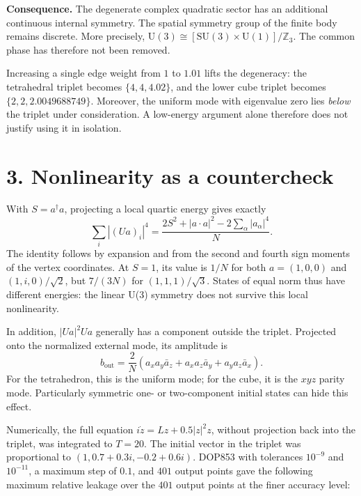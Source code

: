 \documentclass[a4paper,11pt]{article}
\begin{document}
\textbf{Consequence.} The degenerate complex quadratic sector has an additional continuous internal symmetry. The spatial symmetry group of the finite body remains discrete. More precisely, $\mathrm{U}(3)\cong[\mathrm{SU}(3)\times\mathrm{U}(1)]/\mathbb Z_3$. The common phase has therefore not been removed.

Increasing a single edge weight from $1$ to $1.01$ lifts the degeneracy: the tetrahedral triplet becomes $\{4,4,4.02\}$, and the lower cube triplet becomes $\{2,2,2.0049688749\}$. Moreover, the uniform mode with eigenvalue zero lies \emph{below} the triplet under consideration. A low-energy argument alone therefore does not justify using it in isolation.

\section*{3. Nonlinearity as a countercheck}
With $S=a^\dagger a$, projecting a local quartic energy gives exactly
\begin{equation}
\sum_i |(Ua)_i|^4=\frac{2S^2+|a\cdot a|^2-2\sum_\alpha|a_\alpha|^4}{N}.\tag{3}
\end{equation}
The identity follows by expansion and from the second and fourth sign moments of the vertex coordinates. At $S=1$, its value is $1/N$ for both $a=(1,0,0)$ and $(1,i,0)/\sqrt2$, but $7/(3N)$ for $(1,1,1)/\sqrt3$. States of equal norm thus have different energies: the linear U(3) symmetry does not survive this local nonlinearity.

In addition, $|Ua|^2Ua$ generally has a component outside the triplet. Projected onto the normalized external mode, its amplitude is
\begin{equation}
b_{\mathrm{out}}=\frac{2}{N}(a_xa_y\bar a_z+a_xa_z\bar a_y+a_ya_z\bar a_x).\tag{4}
\end{equation}
For the tetrahedron, this is the uniform mode; for the cube, it is the $xyz$ parity mode. Particularly symmetric one- or two-component initial states can hide this effect.

Numerically, the full equation $i\dot z=Lz+0.5|z|^2z$, without projection back into the triplet, was integrated to $T=20$. The initial vector in the triplet was proportional to $(1,0.7+0.3i,-0.2+0.6i)$. DOP853 with tolerances $10^{-9}$ and $10^{-11}$, a maximum step of $0.1$, and $401$ output points gave the following maximum relative leakage over the $401$ output points at the finer accuracy level:
\end{document}
